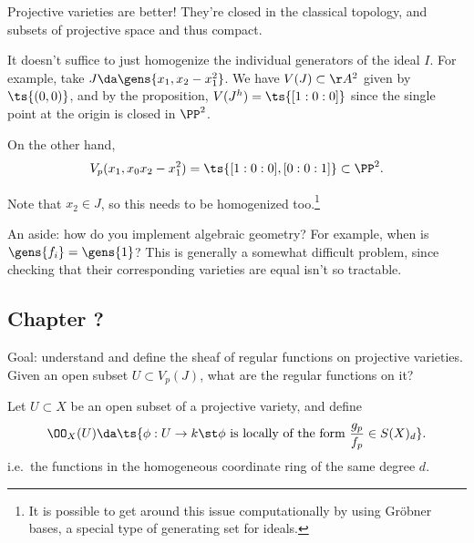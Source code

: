 \begin{remark}

Projective varieties are better! They're closed in the classical
topology, and subsets of projective space and thus compact.

\end{remark}

\begin{remark}

It doesn't suffice to just homogenize the individual generators of the
ideal \(I\). For example, take \(J \da \gens{x_1, x_2 - x_1^2}\). We
have \(V(J) \subset \AA^2\) given by \(\ts{(0, 0)}\), and by the
proposition, \(V(J^h) = \ts{[1:0:0]}\) since the single point at the
origin is closed in \(\PP^2\).

On the other hand,
\begin{align*}  
V_p(x_1, x_0 x_2 - x_1^2) = \ts{[1:0:0], [0:0:1]} \subset \PP^2
.\end{align*}

Note that \(x_2 \in J\), so this needs to be homogenized too.\footnote{It
  is possible to get around this issue computationally by using Gröbner
  bases, a special type of generating set for ideals.}

\end{remark}

\begin{remark}

An aside: how do you implement algebraic geometry? For example, when is
\(\gens{f_i} = \gens{1}\)? This is generally a somewhat difficult
problem, since checking that their corresponding varieties are equal
isn't so tractable.

\end{remark}

\hypertarget{chapter}{%
\subsection{Chapter ?}\label{chapter}}

Goal: understand and define the sheaf of regular functions on projective
varieties. Given an open subset \(U\subset V_p(J)\), what are the
regular functions on it?

\begin{definition}

Let \(U\subset X\) be an open subset of a projective variety, and define
\begin{align*}  
\OO_X(U) \da \ts{\phi:U\to k \st \phi \text{ is locally of the form }   {g_p \over f_p} \in S(X)_d }
.\end{align*} i.e.~the functions in the homogeneous coordinate ring of
the same degree \(d\).

\end{definition}

